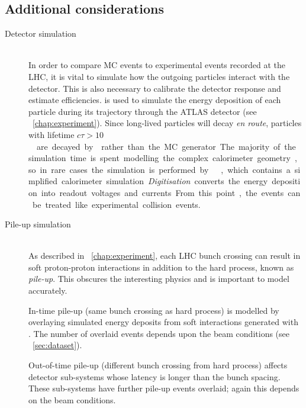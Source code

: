 \subsection{Additional considerations}
\label{sec:mc:other}

\begin{description}
\item[Detector simulation] \hfill \\
	In order to compare \ac{MC} events to experimental events recorded at the \acs{LHC}, 
	it is vital to simulate how the outgoing particles interact with the detector. This 
	is also necessary to calibrate the detector response and estimate efficiencies. 
	\geant \cite{GEANT4,ATLAS-simulation} is used to simulate the energy deposition of 
	each particle during its trajectory through the ATLAS detector (see 
	\Chapter~\ref{chap:experiment}). Since long-lived particles will decay \textit{en 
	route}, particles with lifetime \unit{$c\tau > 10$}{\milli\metre} are decayed by 
	\geant rather than the \ac{MC} generator. The majority of the simulation time is 
	spent modelling the complex calorimeter geometry, so in rare cases the simulation is 
	performed by \atlfast \cite{Atlfast}, which contains a simplified calorimeter 
	simulation.

	\textit{Digitisation} converts the energy deposition into readout voltages and 
	currents. From this point, the events can be treated like experimental collision 
	events.
\item[Pile-up simulation] \hfill \\
	As described in \Chapter~\ref{chap:experiment}, each \acs{LHC} bunch crossing can 
	result in soft proton-proton interactions in addition to the hard process, known as 
	\textit{pile-up}. This obscures the interesting physics and is important to model 
	accurately.

	In-time pile-up (same bunch crossing as hard process) is modelled by overlaying 
	simulated energy deposits from soft \pp interactions generated with . The 
	number of overlaid events depends upon the beam conditions (see 
	\Section~\ref{sec:dataset}).

	Out-of-time pile-up (different bunch crossing from hard process) affects detector 
	sub-systems whose latency is longer than the bunch spacing. These sub-systems have 
	further pile-up events overlaid; again this depends on the beam conditions.
\end{description}
